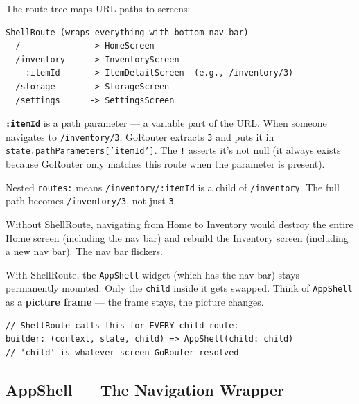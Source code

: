 \documentclass[11pt, a4paper]{article}
\begin{document}
The route tree maps URL paths to screens:

\begin{lstlisting}[numbers=none]
ShellRoute (wraps everything with bottom nav bar)
  /              -> HomeScreen
  /inventory     -> InventoryScreen
    :itemId      -> ItemDetailScreen  (e.g., /inventory/3)
  /storage       -> StorageScreen
  /settings      -> SettingsScreen
\end{lstlisting}

\textbf{\texttt{:itemId}} is a path parameter --- a variable part of the URL. When someone navigates to \texttt{/inventory/3}, GoRouter extracts \texttt{3} and puts it in \texttt{state.pathParameters['itemId']}. The \texttt{!} asserts it's not null (it always exists because GoRouter only matches this route when the parameter is present).

Nested \texttt{routes:} means \texttt{/inventory/:itemId} is a child of \texttt{/inventory}. The full path becomes \texttt{/inventory/3}, not just \texttt{3}.

\begin{conceptbox}[title=\textbf{ShellRoute --- Persistent Bottom Nav Bar}]
Without ShellRoute, navigating from Home to Inventory would destroy the entire Home screen (including the nav bar) and rebuild the Inventory screen (including a new nav bar). The nav bar flickers.

With ShellRoute, the \texttt{AppShell} widget (which has the nav bar) stays permanently mounted. Only the \texttt{child} inside it gets swapped. Think of \texttt{AppShell} as a \textbf{picture frame} --- the frame stays, the picture changes.

\begin{lstlisting}[numbers=none]
// ShellRoute calls this for EVERY child route:
builder: (context, state, child) => AppShell(child: child)
// 'child' is whatever screen GoRouter resolved
\end{lstlisting}
\end{conceptbox}

\subsection{AppShell --- The Navigation Wrapper}
\end{document}
